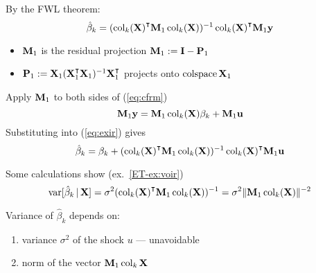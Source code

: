 \begin{frame}
    
    \vspace{2em}
    By the FWL theorem:
    \begin{equation}
        \label{eq:exir}
        \hat \beta_k 
        = (\col_k(\boldX)^\T \boldM_1 \col_k(\boldX))^{-1} \col_k(\boldX)^\T \boldM_1 \boldy
    \end{equation}
    \begin{itemize}
        \item $\mathbf M_1$ is the residual projection 
    $\mathbf M_1 := \mathbf I - \mathbf P_1$
        \item $\boldP_1 := \boldX_1
    (\boldX_1^\T\boldX_1)^{-1} \boldX_1^\T$ projects onto 
    $\operatorname{colspace} \mathbf X_1$
    \end{itemize}

    \vspace{.7em}
    Apply $\mathbf M_1$ to both sides of (\ref{eq:cfrm})
    \begin{equation*}
        \mathbf M_1 {\mathbf y} =  \mathbf M_1 \operatorname{col}_k(\mathbf X) \beta_k + \mathbf M_1 {\mathbf u}
    \end{equation*}
    Substituting into (\ref{eq:exir}) gives 
    \begin{equation}
        \label{eq:exir2}
        \hat \beta_k 
        = \beta_k + (\col_k(\boldX)^\T \boldM_1 \col_k(\boldX))^{-1}
        \col_k(\boldX)^\T \boldM_1 \boldu
    \end{equation}
    
\end{frame}

\begin{frame}
    
    \vspace{2em}
    Some calculations show (ex.~\ref{ET-ex:voir}) 
    \begin{equation*}
        \label{eq:voir}
        \var[ \hat \beta_k \given \boldX ]
        = \sigma^2 
        (\col_k(\boldX)^\T \boldM_1 \col_k(\boldX))^{-1}
        = \sigma^2 \|\boldM_1 \col_k(\boldX)\|^{-2}
    \end{equation*}
    
    \vspace{.7em}
    Variance of $\hat \beta_k$ depends on:
    \begin{enumerate}
        \item  variance
        $\sigma^2$ of the shock $u$ ---  unavoidable
        \item norm of the vector $\mathbf M_1
        \operatorname{col}_k \mathbf X$
    \end{enumerate}
    
\end{frame}

